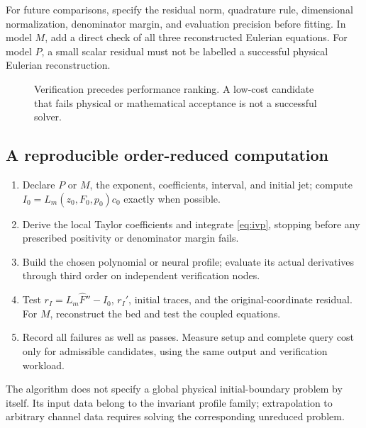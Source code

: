 \documentclass[11pt,a4paper,oneside]{report}
\numberwithin{equation}{chapter}
\begin{document}
For future comparisons, specify the residual norm, quadrature rule, dimensional normalization, denominator margin, and evaluation precision before fitting. In model $M$, add a direct check of all three reconstructed Eulerian equations. For model $P$, a small scalar residual must not be labelled a successful physical Eulerian reconstruction.

\begin{figure}[htbp]\centering
{}
\caption{Verification precedes performance ranking. A low-cost candidate that fails physical or mathematical acceptance is not a successful solver.}\label{fig:gates}
\end{figure}



\subsection*{A reproducible order-reduced computation}
\begin{enumerate}
\item Declare $P$ or $M$, the exponent, coefficients, interval, and initial jet; compute $I_0=L_m(z_0,F_0,p_0)c_0$ exactly when possible.
\item Derive the local Taylor coefficients and integrate \eqref{eq:ivp}, stopping before any prescribed positivity or denominator margin fails.
\item Build the chosen polynomial or neural profile; evaluate its actual derivatives through third order on independent verification nodes.
\item Test $r_I=L_m\widehat F''-I_0$, $r_I'$, initial traces, and the original-coordinate residual. For $M$, reconstruct the bed and test the coupled equations.
\item Record all failures as well as passes. Measure setup and complete query cost only for admissible candidates, using the same output and verification workload.
\end{enumerate}
The algorithm does not specify a global physical initial-boundary problem by itself. Its input data belong to the invariant profile family; extrapolation to arbitrary channel data requires solving the corresponding unreduced problem.
\end{document}
